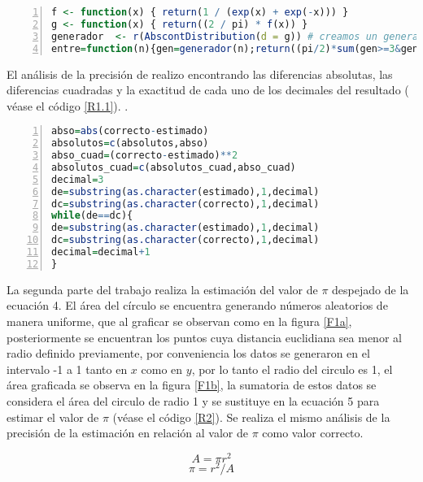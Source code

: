\documentclass{article}
\begin{document}
\lstset{basicstyle=\ttfamily, keywordstyle=\bfseries}
\begin{lstlisting}[frame=single,numbers=left,language=R,caption=Normalización de la función y estimación del área de bajo de la curva entre 7 y 3. \label{R1}]
 f <- function(x) { return(1 / (exp(x) + exp(-x))) }
g <- function(x) { return((2 / pi) * f(x)) }
generador  <- r(AbscontDistribution(d = g)) # creamos un generador
entre=function(n){gen=generador(n);return((pi/2)*sum(gen>=3&gen<=7)/n)}

\end{lstlisting}  
El análisis de la precisión de realizo encontrando las diferencias absolutas, las diferencias cuadradas y la exactitud de cada uno de los decimales del resultado ( véase el código \ref{R1.1}).
 \citep{REPOP5}.
\lstset{basicstyle=\ttfamily, keywordstyle=\bfseries}
\begin{lstlisting}[frame=single,numbers=left,language=R,caption=Métodos de obtención de la precision de la estiamción comparada con el valor correcto obtenido de  \emph{Wolfram Alpha} \cite{wolpha}. \label{R1.1}]
 abso=abs(correcto-estimado)
absolutos=c(absolutos,abso)
abso_cuad=(correcto-estimado)**2
absolutos_cuad=c(absolutos_cuad,abso_cuad)
decimal=3
de=substring(as.character(estimado),1,decimal)
dc=substring(as.character(correcto),1,decimal)
while(de==dc){
de=substring(as.character(estimado),1,decimal)
dc=substring(as.character(correcto),1,decimal)
decimal=decimal+1
}

\end{lstlisting}
La segunda parte del trabajo realiza la estimación del valor de $\pi$ despejado de la ecuación 4. El área del círculo se encuentra generando números aleatorios de manera uniforme, que al graficar se observan como en la figura \ref{F1a}, posteriormente se encuentran los puntos cuya distancia euclidiana sea menor al radio definido previamente, por conveniencia los datos se generaron en el intervalo -1 a 1 tanto en $x$ como en $y$, por lo tanto el radio del circulo es 1, el área graficada se observa en la figura \ref{F1b}, la sumatoria de estos datos se considera el área del circulo de radio 1 y se sustituye en la ecuación 5 para estimar el valor de $\pi$ (véase el código \ref{R2}). Se realiza el mismo análisis de la precisión de la estimación en relación al valor de $\pi$ como valor correcto.

\begin{equation}
   A=\pi r^2
\end{equation}
\begin{equation}
    \pi=r^2/A
\end{equation}
\end{document}
